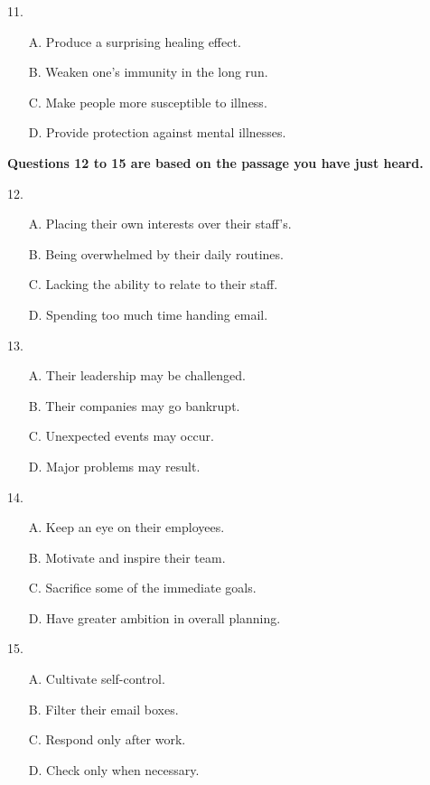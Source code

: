\documentclass[UTF8,11pt]{ctexart}
\begin{document}
11.


\begin{itemize}[leftmargin=2em,itemsep=.2em,topsep=.4em]\item[A.] Produce a surprising healing effect.
\item[B.] Weaken one’s immunity in the long run.
\item[C.] Make people more susceptible to illness.
\item[D.] Provide protection against mental illnesses.
\end{itemize}

\textbf{Questions 12 to 15 are based on the passage you have just heard.}


12.


\begin{itemize}[leftmargin=2em,itemsep=.2em,topsep=.4em]\item[A.] Placing their own interests over their staff’s.
\item[B.] Being overwhelmed by their daily routines.
\item[C.] Lacking the ability to relate to their staff.
\item[D.] Spending too much time handing email.
\end{itemize}

13.


\begin{itemize}[leftmargin=2em,itemsep=.2em,topsep=.4em]\item[A.] Their leadership may be challenged.
\item[B.] Their companies may go bankrupt.
\item[C.] Unexpected events may occur.
\item[D.] Major problems may result.
\end{itemize}

14.


\begin{itemize}[leftmargin=2em,itemsep=.2em,topsep=.4em]\item[A.] Keep an eye on their employees.
\item[B.] Motivate and inspire their team.
\item[C.] Sacrifice some of the immediate goals.
\item[D.] Have greater ambition in overall planning.
\end{itemize}

15.


\begin{itemize}[leftmargin=2em,itemsep=.2em,topsep=.4em]\item[A.] Cultivate self-control.
\item[B.] Filter their email boxes.
\item[C.] Respond only after work.
\item[D.] Check only when necessary.
\end{itemize}
\end{document}
